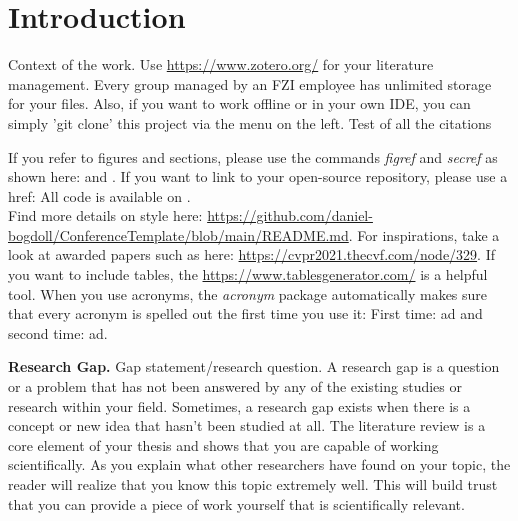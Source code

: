 \section{Introduction}
\label{sec:introduction}

Context of the work. Use \url{https://www.zotero.org/} for your literature management. Every group managed by an FZI employee has unlimited storage for your files. Also, if you want to work offline or in your own IDE, you can simply 'git clone' this project via the menu on the left. Test of all the citations
\cite{Bogdoll_DLCSS_2022_ICECCME}
\cite{Bogdoll_Experiments_2022_ICECCME}
\cite{Woermann_Knowledge_2022_arXiv}
\cite{Bogdoll_Situation_2022_Knowledge}
\cite{Rudolph_Reinforcement_2022_Knowledge}
\cite{Bogdoll_Multimodal_2022_SMC}
\cite{Bogdoll_Anomaly_2022_CVPR}
\cite{Bogdoll_Quantification_2022_IV}
\cite{Bogdoll_Addatasets_2022_VEHITS}
\cite{Toettel_Reliving_2022_ICITE}
\cite{Bogdoll_Taxonomy_2022_FICC}
\cite{Bogdoll_Compressing_2021_NeurIPS}
\cite{Bogdoll_Description_2021_ICCV}
\cite{Bogdoll_KIGLIS_2021_ISC2}
\cite{Reichert_Towards_2021_ISC2}
\cite{Koduri_Aureate_2018_WCX}
\cite{Bogdoll_Augmenting_2017_US}

\cite{Guneshka_Ontology_2022_BA}
\cite{Sartoris_Anomaly_2022_BA}
\cite{Schilling_Anomaly_2022_MA}

\cite{Asam_Openscenario_2020_Web}
\cite{SAE_J3016_2021_Standard}
\cite{IEEE_2846_2022_Standard}

If you refer to figures and sections, please use the commands \textit{figref} and \textit{secref} as shown here:  and . If you want to link to your open-source repository, please use a href: All code is available on \href{https://github.com/daniel-bogdoll/deep_generative_models}{\color{wong-lightblue}{GitHub}}. \\

Find more details on style here: \url{https://github.com/daniel-bogdoll/ConferenceTemplate/blob/main/README.md}. For inspirations, take a look at awarded papers such as here: \url{https://cvpr2021.thecvf.com/node/329}. If you want to include tables, the \url{https://www.tablesgenerator.com/} is a helpful tool. When you use acronyms, the \textit{acronym} package automatically makes sure that every acronym is spelled out the first time you use it: First time: \ac{ad} and second time: \ac{ad}.

\textbf{Research Gap.}
Gap statement/research question. A research gap is a question or a problem that has not been answered by any of the existing studies or research within your field. Sometimes, a research gap exists when there is a concept or new idea that hasn't been studied at all. The literature review is a core element of your thesis and shows that you are capable of working scientifically. As you explain what other researchers have found on your topic, the reader will realize that you know this topic extremely well. This will build trust that you can provide a piece of work yourself that is scientifically relevant.


